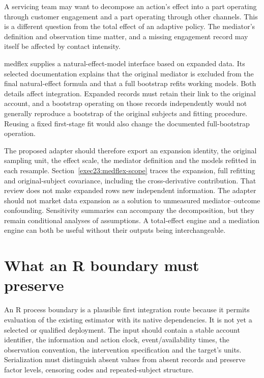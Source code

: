 A servicing team may want to decompose an action's effect into a part operating
through customer engagement and a part operating through other channels. This
is a different question from the total effect of an adaptive policy. The
mediator's definition and observation time matter, and a missing engagement
record may itself be affected by contact intensity.

medflex supplies a natural-effect-model interface based on expanded data. Its
selected documentation explains that the original mediator is excluded from
the final natural-effect formula and that a full bootstrap refits working
models. Both details affect integration. Expanded records must retain their
link to the original account, and a bootstrap operating on those records
independently would not generally reproduce a bootstrap of the original
subjects and fitting procedure. Reusing a fixed first-stage fit would also
change the documented full-bootstrap operation. \citep{v12_sw_medflex}

The proposed adapter should therefore export an expansion identity, the
original sampling unit, the effect scale, the mediator definition and the
models refitted in each resample. Section~\ref{exec23:medflex-scope} traces
the expansion, full refitting and original-subject covariance, including the
cross-derivative contribution. That review does not make expanded rows new
independent information. The adapter should not market data expansion as a
solution to unmeasured mediator--outcome confounding. Sensitivity summaries
can accompany the decomposition, but they remain conditional analyses of
assumptions. A total-effect engine and a mediation engine can both be useful
without their outputs being interchangeable.

\section{What an R boundary must preserve}

An R process boundary is a plausible first integration route because it permits
evaluation of the existing estimator with its native dependencies. It is not
yet a selected or qualified deployment. The input should contain a stable
account identifier, the information and action clock, event/availability
times, the observation convention, the intervention specification and the
target's units. Serialization must distinguish absent values from absent
records and preserve factor levels, censoring codes and repeated-subject
structure.

